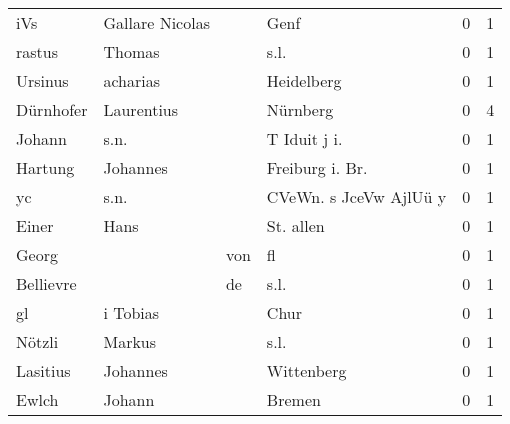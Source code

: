 \begin{tabular}{llllrr}
                      iVs &                    Gallare Nicolas &             &                                        Genf &          0 &         1 \\
                   rastus &                             Thomas &             &                                        s.l. &          0 &         1 \\
                  Ursinus &                           acharias &             &                                  Heidelberg &          0 &         1 \\
                Dürnhofer &                         Laurentius &             &                                    Nürnberg &          0 &         4 \\
                   Johann &                               s.n. &             &                               T Iduit j i.  &          0 &         1 \\
                  Hartung &                           Johannes &             &                            Freiburg i. Br.  &          0 &         1 \\
                       yc &                               s.n. &             &                      CVeWn. s JceVw AjlUü y &          0 &         1 \\
                    Einer &                               Hans &             &                                   St. allen &          0 &         1 \\
                    Georg &                                    &         von &                                          fl &          0 &         1 \\
                Bellievre &                                    &          de &                                        s.l. &          0 &         1 \\
                       gl &                           i Tobias &             &                                        Chur &          0 &         1 \\
                   Nötzli &                             Markus &             &                                        s.l. &          0 &         1 \\
                 Lasitius &                           Johannes &             &                                  Wittenberg &          0 &         1 \\
                    Ewlch &                             Johann &             &                                      Bremen &          0 &         1 \\

\end{tabular}
